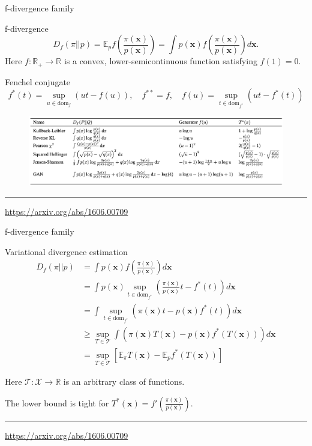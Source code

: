 \documentclass{beamer}
\newcommand{\bx}{\mathbf{x}}
\newcommand{\bbE}{\mathbb{E}}
\newcommand{\bbR}{\mathbb{R}}
\newcommand{\cT}{\mathcal{T}}
\newcommand{\cX}{\mathcal{X}}
\begin{document}
\begin{frame}{f-divergence family}
	
	\begin{block}{f-divergence}
		\vspace{-0.3cm}
		\[
		D_f(\pi || p) = \bbE_p  f\left( \frac{\pi(\bx)}{p(\bx)} \right)  = \int p(\bx) f\left( \frac{\pi(\bx)}{p(\bx)} \right) d \bx.
		\]
		Here $f: \bbR_+ \rightarrow \bbR$ is a convex, lower-semicontinuous function satisfying $f(1) = 0$.
	\end{block}
	\begin{block}{Fenchel conjugate}
		\vspace{-0.5cm}
		\[
		f^*(t) = \sup_{u \in \text{dom}_f} \left( ut - f(u) \right), \quad f^{**} = f, \quad f(u) = \sup_{t \in \text{dom}_{f^*}} \left( ut - f^*(t) \right)
		\]
		\vspace{-0.5cm}
	\end{block}
	\begin{figure}
		\centering
		\includegraphics[width=0.85\linewidth]{figs/f_divs}
	\end{figure}
	\vfill
	\hrule\medskip 
	{\scriptsize \href{https://arxiv.org/abs/1606.00709}{https://arxiv.org/abs/1606.00709}}
\end{frame}
\begin{frame}{f-divergence family}
	\begin{block}{Variational divergence estimation}
		\vspace{-0.3cm}
		\begin{align*}
			D_f(\pi || p) &= \int p(\bx) f\left( \frac{\pi(\bx)}{p(\bx)} \right) d \bx \\
			& = \int p(\bx) \sup_{t \in \text{dom}_{f^*}} \left( \frac{\pi(\bx)}{p(\bx)} t - f^*(t) \right) d \bx \\
			& = \int \sup_{t \in \text{dom}_{f^*}} \left( \pi(\bx)t - p(\bx) f^*(t) \right) d \bx \\
			& \geq \sup_{T \in \cT} \int \left( \pi(\bx)T(\bx) - p(\bx) f^*(T(\bx)) \right) d \bx \\
			& = \sup_{T \in \cT} \left[\bbE_{\pi}T(\bx) -  \bbE_p f^*(T(\bx)) \right]
		\end{align*}
	\end{block}
	Here $\cT: \cX \rightarrow \bbR$ is an arbitrary class of functions.
	
	The lower bound is tight for $T^*(\bx) = f'\left( \frac{\pi(\bx)}{p(\bx)} \right)$.
	\vfill
	\hrule\medskip 
	{\scriptsize \href{https://arxiv.org/abs/1606.00709}{https://arxiv.org/abs/1606.00709}}
\end{frame}
\end{document}
